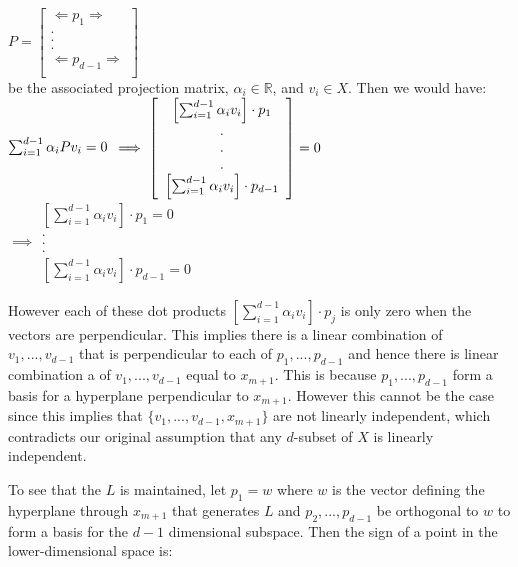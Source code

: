 \documentclass[]{article}
\begin{document}
$P = \left[
\begin{array}{c}
\Leftarrow p_1 \Rightarrow\\
.\\
.\\
.\\
\Leftarrow p_{d-1} \Rightarrow\\
\end{array}
\right]
$\\

be the associated projection matrix, $\alpha_i \in \mathbb{R}$, and $v_i \in X$. Then we would have:\\

$\sum_{i=1}^{d-1} \alpha_i P v_i = 0\\
$
$
\implies \left[
\begin{array}{c}
\left[\sum_{i=1}^{d-1} \alpha_i v_i\right]  \cdot p_1\\
.\\
.\\
.\\
\left[\sum_{i=1}^{d-1} \alpha_i v_i\right]  \cdot p_{d-1}
\end{array}
\right]
=0\\\\\\
$
$
\implies
\begin{array}{c}
\left[\sum_{i=1}^{d-1} \alpha_i v_i\right]  \cdot p_1 = 0\\
.\\
.\\
.\\
\left[\sum_{i=1}^{d-1} \alpha_i v_i\right]  \cdot p_{d-1} = 0
\end{array}
$

However each of these dot products $\left[\sum_{i=1}^{d-1} \alpha_i v_i\right]  \cdot p_j$ is only zero when the vectors are perpendicular. This implies there is a linear combination of $v_1, ..., v_{d-1}$ that is perpendicular to each of $p_1, ..., p_{d-1}$ and hence there is linear combination a of $v_1, ..., v_{d-1}$ equal to $x_{m+1}$. This is because $p_1, ..., p_{d-1}$ form a basis for a hyperplane perpendicular to $x_{m+1}$. However this cannot be the case since this implies that $\lbrace v_1, ..., v_{d-1}, x_{m+1} \rbrace $ are not linearly independent, which contradicts our original assumption that any $d$-subset of $X$ is linearly independent.

To see that the $L$ is maintained, let $p_1 = w$ where $w$ is the vector defining the hyperplane through $x_{m+1}$ that generates $L$ and $p_2, ..., p_{d-1}$ be orthogonal to $w$ to form a basis for the $d-1$ dimensional subspace. Then the sign of a point in the lower-dimensional space is:\\
\end{document}
